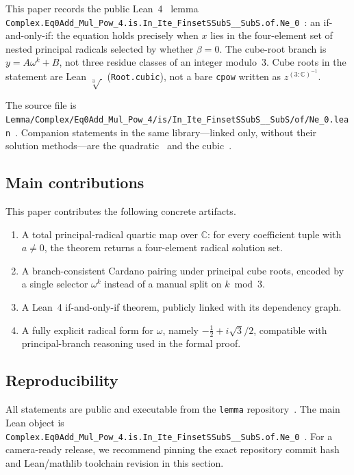 \documentclass[11pt,a4paper]{article}
\newcommand{\C}{\mathbb{C}}
\begin{document}
This paper records the public Lean~4~\cite{moura2021lean4} lemma
\nolinkurl{Complex.Eq0Add_Mul_Pow_4.is.In_Ite_FinsetSSubS__SubS.of.Ne_0}~\cite{lemma_quartic_lean}:
an if-and-only-if: the equation holds precisely when \(x\) lies in the four-element set of nested principal radicals selected by whether \(\beta=0\).
The cube-root branch is \(y=A\omega^{k}+B\), not three residue classes of an integer modulo~3.
Cube roots in the statement are Lean \(\sqrt[3]{\,}\) (\texttt{Root.cubic}), not a bare \texttt{cpow} written as \(z^{(3:\C)^{-1}}\).

The source file is
\nolinkurl{Lemma/Complex/Eq0Add_Mul_Pow_4/is/In_Ite_FinsetSSubS__SubS/of/Ne_0.lean}~\cite{lemma_repo}.
Companion statements in the same library---linked only, without their solution methods---are the quadratic~\cite{lemma_quadratic_lean} and the cubic~\cite{lemma_cubic_lean}.

\subsection{Main contributions}
\label{sec:contrib}

This paper contributes the following concrete artifacts.
\begin{enumerate}[leftmargin=1.3em,itemsep=0.2em]
  \item A total principal-radical quartic map over \(\C\): for every coefficient tuple with \(a\neq 0\), the theorem returns a four-element radical solution set.
  \item A branch-consistent Cardano pairing under principal cube roots, encoded by a single selector \(\omega^k\) instead of a manual split on \(k\bmod 3\).
  \item A Lean~4 if-and-only-if theorem, publicly linked with its dependency graph.
  \item A fully explicit radical form for \(\omega\), namely \(-\tfrac12+i\sqrt{3}/2\), compatible with principal-branch reasoning used in the formal proof.
\end{enumerate}

\subsection{Reproducibility}
\label{sec:repro}

All statements are public and executable from the \nolinkurl{lemma} repository~\cite{lemma_repo}.
The main Lean object is
\nolinkurl{Complex.Eq0Add_Mul_Pow_4.is.In_Ite_FinsetSSubS__SubS.of.Ne_0}~\cite{lemma_quartic_lean}.
For a camera-ready release, we recommend pinning the exact repository commit hash and Lean/mathlib toolchain revision in this section.
\end{document}

